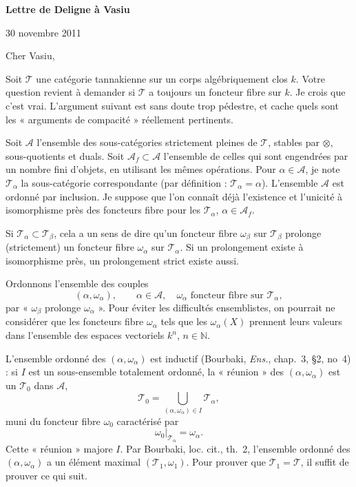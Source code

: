 \documentclass[11pt]{article}
\newcommand{\T}{\mathcal T}
\newcommand{\A}{\mathcal A}
\newcommand{\Af}{\mathcal A_f}
\begin{document}
\begin{center}
{\large\bfseries Lettre de Deligne à Vasiu}
\end{center}

\begin{flushright}
30 novembre 2011
\end{flushright}

Cher Vasiu,

Soit \(\T\) une catégorie tannakienne sur un corps algébriquement clos \(k\). Votre question revient à demander si \(\T\) a toujours un foncteur fibre sur \(k\). Je crois que c'est vrai. L'argument suivant est sans doute trop pédestre, et cache quels sont les « arguments de compacité » réellement pertinents.

Soit \(\A\) l'ensemble des sous-catégories strictement pleines de \(\T\), stables par \(\otimes\), sous-quotients et duals. Soit \(\Af\subset\A\) l'ensemble de celles qui sont engendrées par un nombre fini d'objets, en utilisant les mêmes opérations. Pour \(\alpha\in\A\), je note \(\T_\alpha\) la sous-catégorie correspondante (par définition : \(\T_\alpha=\alpha\)). L'ensemble \(\A\) est ordonné par inclusion. Je suppose que l'on connaît déjà l'existence et l'unicité à isomorphisme près des foncteurs fibre pour les \(\T_\alpha\), \(\alpha\in\Af\).

Si \(\T_\alpha\subset\T_\beta\), cela a un sens de dire qu'un foncteur fibre \(\omega_\beta\) sur \(\T_\beta\) prolonge (strictement) un foncteur fibre \(\omega_\alpha\) sur \(\T_\alpha\). Si un prolongement existe à isomorphisme près, un prolongement strict existe aussi.

Ordonnons l'ensemble des couples
\[
(\alpha,\omega_\alpha),\qquad \alpha\in\A,
\quad \omega_\alpha\text{ foncteur fibre sur }\T_\alpha,
\]
par « \(\omega_\beta\) prolonge \(\omega_\alpha\) ». Pour éviter les difficultés ensemblistes, on pourrait ne considérer que les foncteurs fibre \(\omega_\alpha\) tels que les \(\omega_\alpha(X)\) prennent leurs valeurs dans l'ensemble des espaces vectoriels \(k^n\), \(n\in\mathbb N\).

L'ensemble ordonné des \((\alpha,\omega_\alpha)\) est inductif (Bourbaki, \emph{Ens.}, chap.~3, \S2, no~4) : si \(I\) est un sous-ensemble totalement ordonné, la « réunion » des \((\alpha,\omega_\alpha)\) est un \(\T_0\) dans \(\A\),
\[
\T_0=\bigcup_{(\alpha,\omega_\alpha)\in I}\T_\alpha,
\]
muni du foncteur fibre \(\omega_0\) caractérisé par
\[
\omega_0|_{\T_\alpha}=\omega_\alpha.
\]
Cette « réunion » majore \(I\). Par Bourbaki, loc. cit., th.~2, l'ensemble ordonné des \((\alpha,\omega_\alpha)\) a un élément maximal \((\T_1,\omega_1)\). Pour prouver que \(\T_1=\T\), il suffit de prouver ce qui suit.
\end{document}
